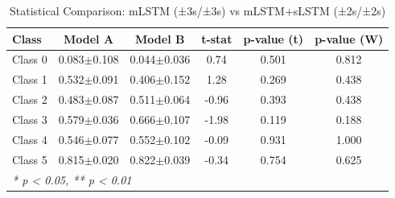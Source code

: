 \begin{table}[htbp]
\centering
\caption{Statistical Comparison: mLSTM (±3s/±3s) vs mLSTM+sLSTM (±2s/±2s)}
\label{tab:comparison_class_mlstm_±3s_±3s_vs_mlstmslstm_±2s_±2s}
\begin{tabular}{lccccc}
\toprule
\textbf{Class} & \textbf{Model A} & \textbf{Model B} & \textbf{t-stat} & \textbf{p-value (t)} & \textbf{p-value (W)} \\
\midrule
Class 0 & 0.083$\pm$0.108 & 0.044$\pm$0.036 & 0.74 & 0.501 & 0.812 \\
Class 1 & 0.532$\pm$0.091 & 0.406$\pm$0.152 & 1.28 & 0.269 & 0.438 \\
Class 2 & 0.483$\pm$0.087 & 0.511$\pm$0.064 & -0.96 & 0.393 & 0.438 \\
Class 3 & 0.579$\pm$0.036 & 0.666$\pm$0.107 & -1.98 & 0.119 & 0.188 \\
Class 4 & 0.546$\pm$0.077 & 0.552$\pm$0.102 & -0.09 & 0.931 & 1.000 \\
Class 5 & 0.815$\pm$0.020 & 0.822$\pm$0.039 & -0.34 & 0.754 & 0.625 \\
\bottomrule
\multicolumn{6}{l}{\textit{* p < 0.05, ** p < 0.01}} \\
\end{tabular}
\end{table}